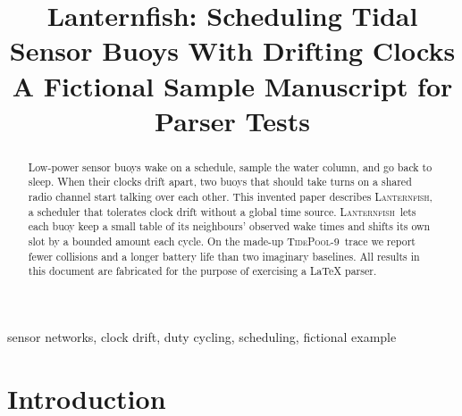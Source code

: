 \documentclass[conference]{IEEEtran}
\newcommand{\sysname}{\textsc{Lanternfish}}
\newcommand{\dataset}{\textsc{TidePool-9}}
\begin{document}
\title{Lanternfish: Scheduling Tidal Sensor Buoys With Drifting Clocks\\
{\large A Fictional Sample Manuscript for Parser Tests}}

\author{
\and
{}
\and
{}
}

\maketitle

\begin{abstract}
Low-power sensor buoys wake on a schedule, sample the water column, and go back
to sleep. When their clocks drift apart, two buoys that should take turns on a
shared radio channel start talking over each other. This invented paper
describes \sysname, a scheduler that tolerates clock drift without a global time
source. \sysname\ lets each buoy keep a small table of its neighbours' observed
wake times and shifts its own slot by a bounded amount each cycle. On the
made-up \dataset\ trace we report fewer collisions and a longer battery life
than two imaginary baselines. All results in this document are fabricated for
the purpose of exercising a LaTeX parser.
\end{abstract}

\begin{IEEEkeywords}
sensor networks, clock drift, duty cycling, scheduling, fictional example
\end{IEEEkeywords}

\section{Introduction}
\label{sec:intro}
\end{document}
